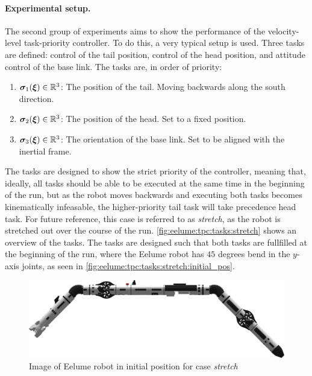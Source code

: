 \paragraph{Experimental setup.}
The second group of experiments aims to show the performance of the velocity-level
task-priority controller. To do this, a very typical setup is used.
Three tasks are defined: control of the tail position, control of the head position, and attitude control of the base link.
The tasks are, in order of priority:
\begin{enumerate}
    \item \(\bm{\sigma}_1(\bm{\xi}) \in \mathbb{R}^3\): The position of the tail. Moving backwards along the south direction.
    \item \(\bm{\sigma}_2(\bm{\xi}) \in \mathbb{R}^3\): The position of the head. Set to a fixed position.
    \item \(\bm{\sigma}_3(\bm{\xi}) \in \mathbb{R}^3\): The orientation of the base link. Set to be aligned with the inertial frame.
\end{enumerate}
The tasks are designed to
show the strict priority of the controller, meaning that, ideally, all tasks
should be able to be executed at the same time in the beginning of the run, but
as the robot moves backwards and executing both tasks becomes kinematically infeasable,
the higher-priority tail task will take precedence head task. For future reference, this
case is referred to as \textit{stretch}, as the robot is stretched out over
the course of the run. \autoref{fig:eelume:tpc:tasks:stretch} shows an overview of the tasks.
The tasks are designed such that both tasks are fullfilled at the beginning of the run,
where the Eelume robot has \(45\) degrees bend in the \(y\)-axis joints, as
seen in \autoref{fig:eelume:tpc:tasks:stretch:initial_pos}.

\begin{figure}[!ht]
    \centering
    \includegraphics[width=\textwidth]{assets/side-view-45-joints.png}
    \caption{Image of Eelume robot in initial position for case \textit{stretch}}
    \label{fig:eelume:tpc:tasks:stretch:initial_pos}
\end{figure}

